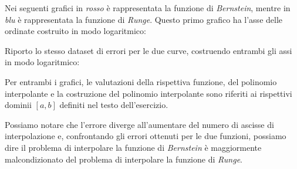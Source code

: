 Nei seguenti grafici in
\emph{rosso} \`e rappresentata la funzione di \emph{Bernstein}, mentre in \emph{blu} \`e rappresentata la funzione di
\emph{Runge}. Questo primo grafico ha l'asse delle ordinate costruito in
modo logaritmico:
\begin{center}   

\end{center}
Riporto lo stesso dataset di errori per le due curve, costruendo entrambi gli
assi in modo logaritmico:
\begin{center}  

\end{center}
Per entrambi i grafici, le valutazioni della rispettiva funzione, del polinomio
interpolante e la costruzione del polinomio interpolante sono riferiti ai
rispettivi dominii $[a,b]$ definiti nel testo dell'esercizio.

Possiamo notare che l'errore diverge all'aumentare del numero di ascisse di
interpolazione e, confrontando gli errori ottenuti per le due funzioni, possiamo
dire il problema di interpolare la funzione di \emph{Bernstein} \`e maggiormente
malcondizionato del problema di interpolare la funzione di \emph{Runge}.

